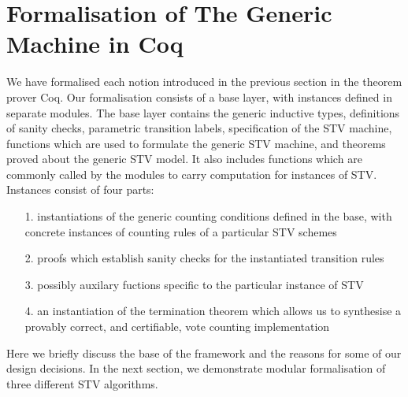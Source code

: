 \documentclass{llncs}
\begin{document}
\section{Formalisation of The Generic Machine in Coq}
We have formalised each notion introduced in the previous section in
the theorem prover Coq. Our formalisation consists of a base layer,
with instances defined in separate modules.
The base layer contains the generic
inductive types, definitions of sanity checks, parametric transition
labels, specification of the STV machine, functions which are used
to formulate the generic STV machine, and theorems proved about the
generic STV model. It also includes functions which are commonly
called by the modules to carry computation for instances of STV.
Instances consist of four parts:

\begin{itemize}
\item[1.] instantiations of the generic counting conditions defined in the base, with concrete instances of counting rules of a particular STV schemes
\item[2.] proofs which establish sanity checks for the instantiated transition rules
\item[3.] possibly auxilary fuctions specific to the particular
instance of STV
\item[4.] an instantiation of the termination theorem which allows
us to synthesise a provably correct, and certifiable, vote counting
implementation
\end{itemize}       
Here we  briefly discuss the base of the framework and the reasons for some of our design decisions. In the next section, we demonstrate  modular formalisation of three different STV algorithms.  
\end{document}

